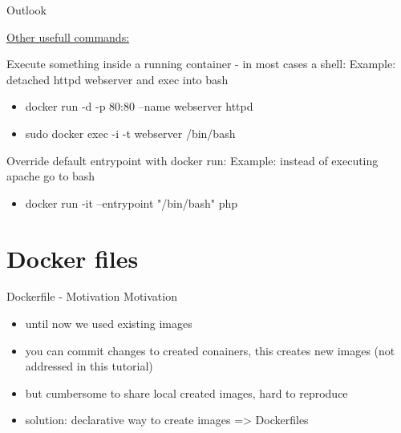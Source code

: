 \documentclass[10pt,aspectratio=\ratio,
compress
]{beamer}
\begin{document}
\begin{frame}{Outlook}

\href{https://docs.docker.com/engine/reference/run/}{Other usefull commands:}

Execute something inside a running container - in most cases a shell:
Example: detached httpd webserver and exec into bash
\begin{itemize}
	\item docker run -d -p 80:80 --name webserver httpd
	\item sudo docker exec -i -t webserver /bin/bash
\end{itemize}


Override default entrypoint with docker run:
Example: instead of executing apache go to bash
\begin{itemize}
	\item docker run -it --entrypoint "/bin/bash" php
\end{itemize}

\end{frame}


\section{Docker files}

\begin{frame}{Dockerfile - Motivation}
Motivation
\begin{itemize}
	\item until now we used existing images
	\item you can commit changes to created conainers, this creates new images (not addressed in this tutorial)
	\item but cumbersome to share local created images, hard to reproduce
	\item solution: declarative way to create images => Dockerfiles
\end{itemize}

\end{frame}
\end{document}
